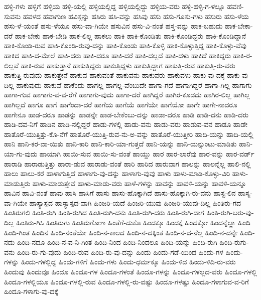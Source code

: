 {ಹಳ್ಳಿ-ಗಳು
ಹಳ್ಳಿಗೆ
ಹಳ್ಳಿಯ
ಹಳ್ಳಿ-ಯಲ್ಲಿ
ಹಳ್ಳಿಯಲ್ಲಿದ್ದ
ಹಳ್ಳಿಯಲ್ಲಿದ್ದು
ಹಳ್ಳಿಯ-ವರು
ಹಳ್ಳಿ-ಹಳ್ಳಿ-ಗ-ಳಲ್ಲೂ
ಹವಣಿ-ಸುವನು
ಹವಳದ
ಹವಾಗುಣ
ಹವಿಸ್ಸನ್ನು
ಹಸಿರು
ಹಸಿ-ವನ್ನು
ಹಸಿವು
ಹಸು
ಹಸು-ಗೂಸು-ಗಳು
ಹಸುರು
ಹಸು-ಳೆಯ
ಹಸು-ಳೆ-ಯಂತೆ
ಹಸು-ಳೆಯೂ
ಹಸು-ವಾ-ಗಿಯೇ
ಹಸುವಿನ
ಹಸು-ವಿ-ನಂತೆ
ಹಸ್ತ-ವನ್ನು
ಹಾಕ-ಬಹುದು
ಹಾಕ-ಬೇಕಾ-ದರೆ
ಹಾಕ-ಬೇಕು
ಹಾಕ-ಬೇಡಿ
ಹಾಕ-ಲಿಲ್ಲ
ಹಾಕಲು
ಹಾಕಿ
ಹಾಕಿ-ಕೊಂಡಿತು
ಹಾಕಿ-ಕೊಂಡಿದ್ದರು
ಹಾಕಿ-ಕೊಂಡಿದ್ದಾನೆ
ಹಾಕಿ-ಕೊಂಡಿ-ರುವ
ಹಾಕಿ-ಕೊಂಡಿ-ರುವು-ದನ್ನು
ಹಾಕಿ-ಕೊಂಡು
ಹಾಕಿ-ಕೊಳ್ಳಿ
ಹಾಕಿ-ಕೊಳ್ಳುತ್ತಿದ್ದ
ಹಾಕಿ-ಕೊಳ್ಳು-ವೆವು
ಹಾಕಿದ
ಹಾಕಿ-ದ-ಮೇಲೆ
ಹಾಕಿ-ದರು
ಹಾಕಿ-ದರೂ
ಹಾಕಿ-ದರೆ
ಹಾಕಿ-ದಲ್ಲದೆ
ಹಾಕಿ-ದಳು
ಹಾಕಿದೆ
ಹಾಕಿದ್ದರು
ಹಾಕಿ-ರ-ಲಿಲ್ಲವೆ
ಹಾಕಿ-ರುವ
ಹಾಕುತ್ತಾನೆ
ಹಾಕುತ್ತಿದ್ದರು
ಹಾಕುತ್ತಿದ್ದಳು
ಹಾಕುತ್ತಿದ್ದಾಗ
ಹಾಕುತ್ತಿ-ರುವ
ಹಾಕುತ್ತಿ-ರು-ವರು
ಹಾಕುತ್ತಿ-ರುವುದು
ಹಾಕುತ್ತೇನೆ
ಹಾಕುವ
ಹಾಕುವಂತೆ
ಹಾಕುವನು
ಹಾಕುವರು
ಹಾಕುವಳು
ಹಾಕು-ವು-ದಕ್ಕೆ
ಹಾಕು-ವು-ದಿಲ್ಲ
ಹಾಕುವುದು
ಹಾಕುವೆ
ಹಾಕೆಂದು
ಹಾಗಲ್ಲ
ಹಾಗಲ್ಲ-ವೆಂಬುದೇ
ಹಾಗಾ-ಗದೆ
ಹಾಗಾಗಿದ್ದರೆ
ಹಾಗಾ-ಗಿಲ್ಲ
ಹಾಗಾಗು
ಹಾಗಾ-ಗುವ
ಹಾಗಾಗು-ವ-ವ-ರೆಗೆ
ಹಾಗಾಗು-ವುದು
ಹಾಗಾ-ದರೆ
ಹಾಗಿದ್ದರೆ
ಹಾಗಿರ-ಕೂಡದು
ಹಾಗಿರ-ಲಿಲ್ಲ
ಹಾಗಿಲ್ಲ
ಹಾಗಿಲ್ಲದೆ
ಹಾಗೂ
ಹಾಗೆ
ಹಾಗೆಂದಾ-ದರೆ
ಹಾಗೆಯ
ಹಾಗೆಯೆ
ಹಾಗೆಯೇ
ಹಾಗೆಯೋ
ಹಾಗೇ
ಹಾಗೇ-ನಾದರೂ
ಹಾಗೇನೂ
ಹಾಡ-ದರೂ
ಹಾಡನ್ನು
ಹಾಡನ್ನೇ
ಹಾಡ-ಬೇಕೆಂಬು-ದನ್ನು
ಹಾಡಾ-ದರೂ
ಹಾಡಿ
ಹಾಡಿ-ದನು
ಹಾಡಿ-ದರು
ಹಾಡಿ-ದವ-ನಿಗೆ
ಹಾಡಿನ
ಹಾಡಿ-ನಲ್ಲಿದ್ದರೆ
ಹಾಡು-ಗಳಲ್ಲಿ
ಹಾಡು-ವನು
ಹಾಡು-ವರು
ಹಾಡುವ-ವನ
ಹಾಡೂ
ಹಾಡೇ
ಹಾತೊರೆ-ಯುತ್ತಿತ್ತು-ಕೊ-ನೆಗೆ
ಹಾತೊರೆ-ಯುತ್ತಿ-ರುವ-ನು-ಅ-ವನ್ನು
ಹಾತೊರೆ-ಯುತ್ತೀರಿ
ಹಾದಿ-ಯನ್ನು
ಹಾದಿ-ಯಲ್ಲಿ
ಹಾನಿ
ಹಾನಿ-ಕರ-ವಾ-ಯಿತು
ಹಾನಿ-ಕಾರಿ
ಹಾನಿ-ಕಾರಿ-ಯಾ-ಗುತ್ತದೆ
ಹಾನಿ-ಯನ್ನು
ಹಾನಿ-ಯನ್ನುಂಟು-ಮಾಡಿತು
ಹಾನಿ-ಯಾ-ಗು-ವುದು
ಹಾಯಾಗಿ
ಹಾಯಿ-ಸುವ
ಹಾಯಿ-ಸು-ವಂತೆ
ಹಾಯ್ದು
ಹಾರ
ಹಾರ-ಲಾರೆವು
ಹಾರ-ವನ್ನು
ಹಾರ-ವರ್ಡ್
ಹಾರಾಡಿ
ಹಾರಾಡುತ್ತಿತ್ತು
ಹಾರಾ-ಡುವ
ಹಾರಾಡು-ವಂತೆ
ಹಾರಿ
ಹಾರಿದ
ಹಾರುವಾಗ
ಹಾಲನ್ನು
ಹಾಲನ್ನೆಲ್ಲ
ಹಾಲಿ-ನಲ್ಲಿ
ಹಾಲು
ಹಾಲು-ಕರೆ
ಹಾಳಾಗುತ್ತಿದೆ
ಹಾಳಾಗು-ವು-ದನ್ನು
ಹಾಳಾಗು-ವುವು
ಹಾಳು
ಹಾಳು-ಮಾಡಿ-ಕೊಳ್ಳು-ವಿರಿ
ಹಾಳು-ಮಾಡುತ್ತಿರು
ಹಾಳು-ಮಾಡುತ್ತೇವೆ
ಹಾಳು-ಮಾಡು-ವರು
ಹಾಳೆ-ಗಳನ್ನು
ಹಾವನ್ನು
ಹಾವಳಿ-ಯನ್ನು
ಹಾವಳಿ-ಯನ್ನೂ
ಹಾವಿನ
ಹಾವಿ-ನಂತೆ
ಹಾವು
ಹಾಸಿ
ಹಾಸಿಗೆ
ಹಾಸು
ಹಾಸು-ಹೊಕ್ಕಾಗಿದೆ
ಹಾಸು-ಹೊಕ್ಕಾಗಿ-ರು-ವನು
ಹಾಸ್ಟ-ಲಿನ
ಹಾಸ್ಯ-ವಾ-ಗಿಯೇ
ಹಾಸ್ಯಾಸ್ಪದ
ಹಾಸ್ಯಾಸ್ಪದ-ವಾಗಿ
ಹಿಂಜರಿ-ಯದೆ
ಹಿಂಜರಿ-ಯುವು
ಹಿಂಜರಿ-ಯುವು-ದಿಲ್ಲ
ಹಿಂತಿರು-ಗದ
ಹಿಂತಿರುಗಲಿ
ಹಿಂತಿ-ರುಗಿ
ಹಿಂತಿ-ರುಗಿದ
ಹಿಂತಿ-ರುಗಿ-ದನು
ಹಿಂತಿ-ರುಗಿ-ದರು
ಹಿಂತಿ-ರುಗಿ-ದಾಗ
ಹಿಂತಿ-ರುಗಿ-ಬರು-ವು-ದಿಲ್ಲ
ಹಿಂತಿರು-ಗಿಸಿ
ಹಿಂತಿರುಗು
ಹಿಂತಿರುಗೋಣ
ಹಿಂತೆಗೆ-ದುಕೊ
ಹಿಂದಕ್ಕೂ
ಹಿಂದಕ್ಕೆ
ಹಿಂದಕ್ಕೋ
ಹಿಂದನ್ನೆಲ್ಲಾ
ಹಿಂದಿ
ಹಿಂದಿ-ಗಿಂತ
ಹಿಂದಿನ
ಹಿಂದಿ-ನಂತೆಯೇ
ಹಿಂದಿ-ನ-ಕಾಲದ
ಹಿಂದಿ-ನ-ದಕ್ಕಿಂತ
ಹಿಂದಿ-ನ-ದ-ನೆಲ್ಲ
ಹಿಂದಿ-ನ-ದನ್ನೇ
ಹಿಂದಿ-ನದು
ಹಿಂದಿ-ನದೂ
ಹಿಂದಿ-ನ-ವ-ನಿ-ಗಿಂತ
ಹಿಂದಿ-ನಿಂದ
ಹಿಂದಿ-ನಿಂದಲೂ
ಹಿಂದಿ-ಯನ್ನು
ಹಿಂದಿ-ರುಗಿ
ಹಿಂದಿ-ರುಗು-ವನು
ಹಿಂದಿ-ರು-ಗು-ವುದು
ಹಿಂದಿ-ರುವ
ಹಿಂದಿ-ರು-ವು-ದನ್ನು
ಹಿಂದು
ಹಿಂದು-ಗಡೆ-ಯಿಂದ
ಹಿಂದು-ಗಳ
ಹಿಂದು-ಗಳನ್ನು
ಹಿಂದು-ಗಳಲ್ಲಿದ್ದ
ಹಿಂದು-ಗಳಿಗೆ
ಹಿಂದು-ಗಳು
ಹಿಂದು-ಧರ್ಮಕ್ಕೂ
ಹಿಂದು-ಳಿದ
ಹಿಂದು-ಳಿದಿ-ರು-ವರು
ಹಿಂದುವು
ಹಿಂದುವೂ
ಹಿಂದೂ
ಹಿಂದೂ-ಗಳ
ಹಿಂದೂ-ಗಳಂತೆ
ಹಿಂದೂ-ಗಳನ್ನು
ಹಿಂದೂ-ಗಳಲ್ಲದ-ವರು
ಹಿಂದೂ-ಗಳಲ್ಲಿ
ಹಿಂದೂ-ಗಳಲ್ಲಿಯೂ
ಹಿಂದೂ-ಗಳಲ್ಲಿ-ರುವ
ಹಿಂದೂ-ಗಳಲ್ಲಿ-ರು-ವಷ್ಟು
ಹಿಂದೂ-ಗಳಷ್ಟು
ಹಿಂದೂ-ಗಳಾಗುವ-ವ-ರಿಗೆ
ಹಿಂದೂ-ಗಳಾಗು-ವು-ದಕ್ಕೆ
}
